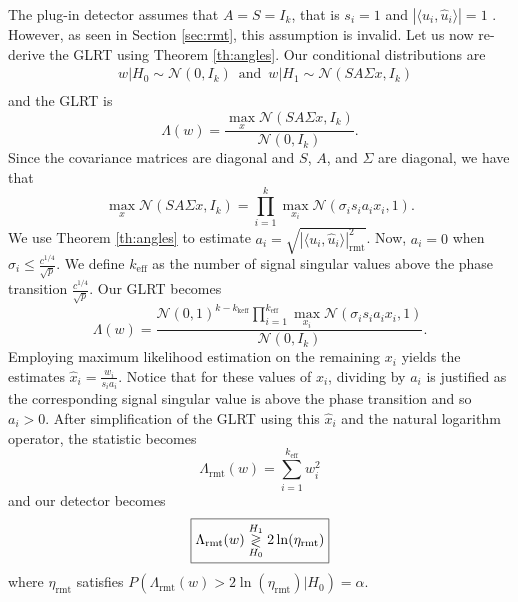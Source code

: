 The plug-in detector assumes that $A=S=I_k$, that is $s_i=1$ and $|\langle u_i,\widehat{u}_i\rangle|=1$ . However, as seen in Section \ref{sec:rmt}, this assumption is invalid. Let us now re-derive the GLRT using Theorem \ref{th:angles}. Our conditional distributions are
\begin{equation*}
\begin{aligned}
&w|H_0\sim\mathcal{N}(0,I_{k})\,\,\,\text{and}\,\,\, w|H_1\sim\mathcal{N}(SA\Sigma x, I_{k})\\
\end{aligned}
\end{equation*}
and the GLRT is
\begin{equation*}
\Lambda(w)=\frac{\max_x\mathcal{N}(SA\Sigma x,I_{k})}{\mathcal{N}(0,I_{k})}.
\end{equation*}
Since the covariance matrices are diagonal and $S$, $A$, and $\Sigma$ are diagonal, we have that
\begin{equation*}
\max_x\mathcal{N}(SA\Sigma x,I_{k})=\prod_{i=1}^k\max_{x_i}\mathcal{N}(\sigma_is_ia_ix_i,1).
\end{equation*}
We use Theorem \ref{th:angles} to estimate $a_i=\sqrt{|\langle u_i,\widehat{u}_i\rangle|^2_{\text{rmt}}}$. Now, $a_i=0$ when $\sigma_i\leq \frac{c^{1/4}}{\sqrt{p}}$. We define $k_\text{eff}$ as the number of signal singular values above the phase transition $\frac{c^{1/4}}{\sqrt{p}}$. Our GLRT becomes
\begin{equation*}
\Lambda(w)=\frac{\mathcal{N}(0,1)^{k-k_\text{keff}}\prod_{i=1}^{k_\text{eff}}\max_{x_i}\mathcal{N}(\sigma_is_ia_ix_i,1)}{\mathcal{N}(0,I_{k})}.
\end{equation*}
Employing maximum likelihood estimation on the remaining $x_i$ yields the estimates $\widehat{x}_i=\frac{w_i}{s_ia_i}$. Notice that for these values of $x_i$, dividing by $a_i$ is justified as the corresponding signal singular value is above the phase transition and so $a_i>0$. After simplification of the GLRT using this $\widehat{x}_i$ and the natural logarithm operator, the statistic becomes
\begin{equation}\label{eq:opt stat}
\boxed{\Lambda_{\text{rmt}}(w) = \sum_{i=1}^{k_\text{eff}}w_i^2}
\end{equation}
and our detector becomes
\begin{equation}\label{eq:opt classifier}
\boxed{\Lambda_{\text{rmt}}(w) \overset{H_1}{\underset{H_0}{\gtrless}} 2\ln(\eta_{\text{rmt}})}
\end{equation}
where $\eta_{\text{rmt}}$ satisfies $P(\Lambda_{\text{rmt}}(w)>2\ln\left(\eta_{\text{rmt}}\right)|H_0)=\alpha$.

